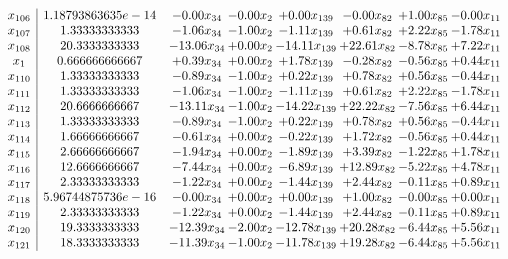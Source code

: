 \documentclass[8pt]{article}
\begin{document}
\[\begin{array}{c| c c@{\hskip 2pt} c@{\hskip 2pt} c@{\hskip 2pt} c@{\hskip 2pt} c@{\hskip 2pt} c@{\hskip 2pt} }
 x_{106}   &  1.18793863635e-14 & -0.00 x_{34} & -0.00 x_{2} & +  0.00 x_{139} & -0.00 x_{82} & +  1.00 x_{85} & -0.00 x_{11}\\
 x_{107}   &  1.33333333333 & -1.06 x_{34} & -1.00 x_{2} & -1.11 x_{139} & +  0.61 x_{82} & +  2.22 x_{85} & -1.78 x_{11}\\
 x_{108}   &  20.3333333333 & -13.06 x_{34} & +  0.00 x_{2} & -14.11 x_{139} & + 22.61 x_{82} & -8.78 x_{85} & +  7.22 x_{11}\\
 x_{1}   &  0.666666666667 & +  0.39 x_{34} & +  0.00 x_{2} & +  1.78 x_{139} & -0.28 x_{82} & -0.56 x_{85} & +  0.44 x_{11}\\
 x_{110}   &  1.33333333333 & -0.89 x_{34} & -1.00 x_{2} & +  0.22 x_{139} & +  0.78 x_{82} & +  0.56 x_{85} & -0.44 x_{11}\\
 x_{111}   &  1.33333333333 & -1.06 x_{34} & -1.00 x_{2} & -1.11 x_{139} & +  0.61 x_{82} & +  2.22 x_{85} & -1.78 x_{11}\\
 x_{112}   &  20.6666666667 & -13.11 x_{34} & -1.00 x_{2} & -14.22 x_{139} & + 22.22 x_{82} & -7.56 x_{85} & +  6.44 x_{11}\\
 x_{113}   &  1.33333333333 & -0.89 x_{34} & -1.00 x_{2} & +  0.22 x_{139} & +  0.78 x_{82} & +  0.56 x_{85} & -0.44 x_{11}\\
 x_{114}   &  1.66666666667 & -0.61 x_{34} & +  0.00 x_{2} & -0.22 x_{139} & +  1.72 x_{82} & -0.56 x_{85} & +  0.44 x_{11}\\
 x_{115}   &  2.66666666667 & -1.94 x_{34} & +  0.00 x_{2} & -1.89 x_{139} & +  3.39 x_{82} & -1.22 x_{85} & +  1.78 x_{11}\\
 x_{116}   &  12.6666666667 & -7.44 x_{34} & +  0.00 x_{2} & -6.89 x_{139} & + 12.89 x_{82} & -5.22 x_{85} & +  4.78 x_{11}\\
 x_{117}   &  2.33333333333 & -1.22 x_{34} & +  0.00 x_{2} & -1.44 x_{139} & +  2.44 x_{82} & -0.11 x_{85} & +  0.89 x_{11}\\
 x_{118}   &  5.96744875736e-16 & -0.00 x_{34} & +  0.00 x_{2} & +  0.00 x_{139} & +  1.00 x_{82} & -0.00 x_{85} & +  0.00 x_{11}\\
 x_{119}   &  2.33333333333 & -1.22 x_{34} & +  0.00 x_{2} & -1.44 x_{139} & +  2.44 x_{82} & -0.11 x_{85} & +  0.89 x_{11}\\
 x_{120}   &  19.3333333333 & -12.39 x_{34} & -2.00 x_{2} & -12.78 x_{139} & + 20.28 x_{82} & -6.44 x_{85} & +  5.56 x_{11}\\
 x_{121}   &  18.3333333333 & -11.39 x_{34} & -1.00 x_{2} & -11.78 x_{139} & + 19.28 x_{82} & -6.44 x_{85} & +  5.56 x_{11}\\

\end{array}\]
\end{document}

